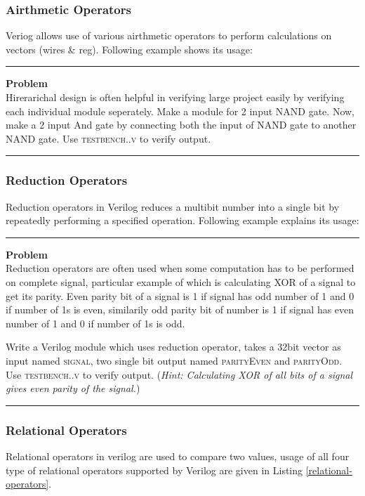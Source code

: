\documentclass[a4paper,10pt]{article}
\newcommand{\ano}{\text{1}}
\theoremstyle{mytheor}
\newcommand{
  \insertverilog}[3]{
  
}
\newcounter{problemNumber}
\newcommand {
  \insertProblem}[1]{
  \vspace{0.5cm}
  \hrule
  \vspace{0.3cm}

  {\color{greatblue}\textbf{\large{Problem \theproblemNumber}}}
  \vspace{2pt}\\#1

  \addtocounter{problemNumber}{1}
  \vspace{0.2cm}
  \hrule  
  \vspace{0.5cm}
}
\begin{document}
\subsubsection*{Airthmetic Operators}
Veriog allows use of various airthmetic operators to perform
calculations on vectors (wires \& reg). Following example shows its
usage:
\insertverilog{./verilog_files/airthmeticOperators.v}{airthmetic-operators}{\text{Functioning of airthmetic operator}}

\insertProblem{Hirerarichal design is often helpful in verifying large project easily by verifying each individual module seperately. Make a module for 2 input NAND gate. Now, make a 2 input And gate by connecting both the input of NAND gate to another NAND gate. Use \textsc{testbench{\ano}.{\theproblemNumber}.v} to verify output.}


\subsubsection*{Reduction Operators}
Reduction operators in Verilog reduces a multibit number into a single
bit by repeatedly performing a specified operation. Following example 
explains its usage: 
\insertverilog{./verilog_files/reductionOperators.v}{reduction-operators}{\text{Functioning of reduction operator}}

\insertProblem {
  Reduction operators are often used when some computation has to be performed on complete signal, particular example of which is calculating XOR of a signal to get its parity. Even parity bit of a signal is 1 if signal has odd number of 1 and 0 if number of 1s is even, similarily odd parity bit of number is 1 if signal has even number of 1 and 0 if number of 1s is odd.

  Write a Verilog module which uses reduction operator, takes a 32bit vector as input named \textsc{signal}, two single bit output named \textsc{parityEven} and \textsc{parityOdd}. Use \textsc{testbench{\ano}.{\theproblemNumber}.v} to verify output. (\textit{Hint: Calculating XOR of all bits of a signal gives even parity of the signal.})
}

\subsubsection*{Relational Operators}
Relational operators in verilog are used to compare two values, usage
of all four type of relational operators supported by Verilog are
given in Listing \ref{relational-operators}.
\insertverilog{./verilog_files/relationalOperators.v}{relational-operators}{\text{Functioning of relational operator}}
  
\end{document}
